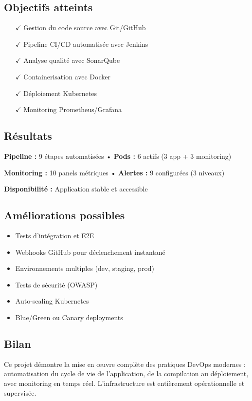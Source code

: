 \documentclass[11pt,a4paper]{article}
\begin{document}
\subsection{Objectifs atteints}
\begin{itemize}
    \item[$\checkmark$] Gestion du code source avec Git/GitHub
    \item[$\checkmark$] Pipeline CI/CD automatisée avec Jenkins
    \item[$\checkmark$] Analyse qualité avec SonarQube
    \item[$\checkmark$] Containerisation avec Docker
    \item[$\checkmark$] Déploiement Kubernetes
    \item[$\checkmark$] Monitoring Prometheus/Grafana
\end{itemize}

\subsection{Résultats}
\begin{tcolorbox}[colback=blue!5!white,colframe=blue!75!black,title=Bilan]
    \textbf{Pipeline :} 9 étapes automatisées • \textbf{Pods :} 6 actifs (3 app + 3 monitoring)
    
    \textbf{Monitoring :} 10 panels métriques • \textbf{Alertes :} 9 configurées (3 niveaux)
    
    \textbf{Disponibilité :} Application stable et accessible
\end{tcolorbox}

\subsection{Améliorations possibles}
\begin{itemize}
    \item Tests d'intégration et E2E
    \item Webhooks GitHub pour déclenchement instantané
    \item Environnements multiples (dev, staging, prod)
    \item Tests de sécurité (OWASP)
    \item Auto-scaling Kubernetes
    \item Blue/Green ou Canary deployments
\end{itemize}

\subsection{Bilan}
Ce projet démontre la mise en œuvre complète des pratiques DevOps modernes : automatisation du cycle de vie de l'application, de la compilation au déploiement, avec monitoring en temps réel. L'infrastructure est entièrement opérationnelle et supervisée.
\end{document}
